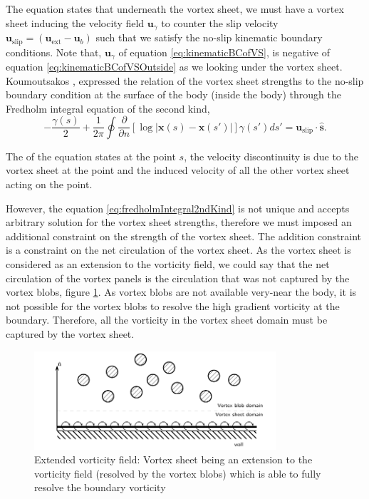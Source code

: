 The equation states that underneath the vortex sheet, we must have a vortex sheet inducing the velocity field $\mathbf{u}_{\gamma}$ to counter the slip velocity $\mathbf{u}_{\mathrm{slip}} = \left(\mathbf{u}_{\mathrm{ext}} - \mathbf{u}_b\right)$ such that we satisfy the no-slip kinematic boundary conditions. Note that, $\mathbf{u}_{\gamma}$ of equation \ref{eq:kinematicBCofVS}, is negative of equation \ref{eq:kinematicBCofVSOutside} as we looking under the vortex sheet. Koumoutsakos \cite{Koumoutsakos1993}, expressed the relation of the vortex sheet strengths to the no-slip boundary condition at the surface of the body (inside the body) through the Fredholm integral equation of the second kind,
	\begin{equation}
	-\frac{\gamma\left(s\right)}{2} + \frac{1}{2\pi}\oint\frac{\partial}{\partial n}\left[\log\left|\mathbf{x}\left(s\right)-\mathbf{x}\left(s'\right)\right|\right]\gamma\left(s'\right)ds'= \mathbf{u}_{\mathrm{slip}}\cdot\mathbf{\hat{s}}.
	\label{eq:fredholmIntegral2ndKind}
	\end{equation}
		
The  of the equation states at the point $s$, the velocity discontinuity is due to the vortex sheet at the point and the induced velocity of all the other vortex sheet acting on the point. 

However, the equation \ref{eq:fredholmIntegral2ndKind} is not unique and accepts arbitrary solution for the vortex sheet strengths, therefore we must imposed an additional constraint on the strength of the vortex sheet. The addition constraint is a constraint on the net circulation of the vortex sheet. As the vortex sheet is considered as an extension to the vorticity field, we could say that the net circulation of the vortex panels	is the circulation that was not captured by the vortex blobs, figure \ref{fig:extendedVorticityField}. As vortex blobs are not available very-near the body, it is not possible for the vortex blobs to resolve the high gradient vorticity at the boundary. Therefore, all the vorticity in the vortex sheet domain must be captured by the vortex sheet.
	
	\begin{figure}[t]
	\centering
	\includegraphics[width=0.8\textwidth]{figures/lagrangian/extendedVorticityField.pdf}
	\caption{Extended vorticity field: Vortex sheet being an extension to the vorticity field (resolved by the vortex blobs) which is able to fully resolve the boundary vorticity}
	\label{fig:extendedVorticityField}
	\end{figure}	
	
